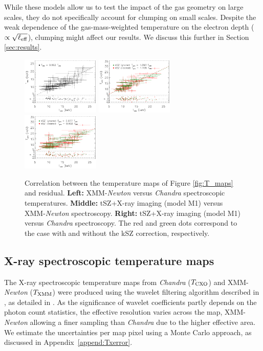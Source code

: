 \documentclass[twocolumn,traditabstract]{aa}
\begin{document}
While these models allow us to test the impact of the gas geometry on large scales, they do not specifically account for clumping on small scales. Despite the weak dependence of the gas-mass-weighted temperature on the electron depth ($\propto \sqrt{\ell_{\rm eff}}$), clumping might affect our results. We discuss this further in Section \ref{sec:results}.

\begin{figure}[h]
\centering
\includegraphics[width=0.33\textwidth]{Figure/Thermo_correlation_TXMM-TCXO.pdf}
\includegraphics[width=0.33\textwidth]{Figure/Thermo_correlation_TXMM-TSZ_leff1.pdf}
\includegraphics[width=0.33\textwidth]{Figure/Thermo_correlation_TCXO-TSZ_leff1.pdf}
\caption{\footnotesize{Correlation between the temperature maps of Figure \ref{fig:T_maps} and residual. {\bf Left:} XMM-\textit{Newton} versus \textit{Chandra} spectroscopic temperatures. {\bf Middle:} tSZ+X-ray imaging (model M1) versus XMM-\textit{Newton} spectroscopy. {\bf Right:} tSZ+X-ray imaging (model M1) versus \textit{Chandra} spectroscopy. The red and green dots correspond to the case with and without the kSZ correction, respectively.}}
\label{fig:T_SZ_T_X_correlation}
\end{figure}

\subsection{X-ray spectroscopic temperature maps}\label{sec:Xray_spectroscopic_temperature_map}
The X-ray spectroscopic temperature maps from \textit{Chandra} (${T}_{\rm CXO}$) and XMM-\textit{Newton} (${T}_{\rm XMM}$) were produced using the wavelet filtering algorithm described in \cite{Bourdin2008}, as detailed in \cite{Adam2016b}. As the significance of wavelet coefficients partly depends on the photon count statistics, the effective resolution varies across the map, XMM-\textit{Newton} allowing a finer sampling than \textit{Chandra} due to the higher effective area. We estimate the uncertainties per map pixel using a Monte Carlo approach, as discussed in Appendix~\ref{append:Txerror}.
\end{document}
